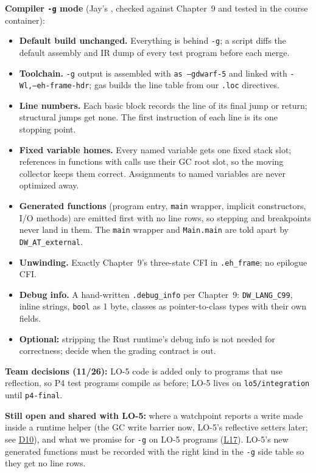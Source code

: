 \documentclass[10pt]{article}
\newcommand{\code}[1]{\texttt{\small #1}}
\begin{document}
\textbf{Compiler \code{-g} mode} (Jay's , checked against Chapter~9 and tested in the course container):
\begin{itemize}
\item \textbf{Default build unchanged.} Everything is behind \code{-g}; a script diffs the default assembly and IR dump of every test program before each merge.
\item \textbf{Toolchain.} \code{-g} output is assembled with \code{as --gdwarf-5} and linked with \code{-Wl,--eh-frame-hdr}; gas builds the line table from our \code{.loc} directives.
\item \textbf{Line numbers.} Each basic block records the line of its final jump or return; structural jumps get none. The first instruction of each line is its one stopping point.
\item \textbf{Fixed variable homes.} Every named variable gets one fixed stack slot; references in functions with calls use their GC root slot, so the moving collector keeps them correct. Assignments to named variables are never optimized away.
\item \textbf{Generated functions} (program entry, \code{main} wrapper, implicit constructors, I/O methods) are emitted first with no line rows, so stepping and breakpoints never land in them. The \code{main} wrapper and \code{Main.main} are told apart by \code{DW\_AT\_external}.
\item \textbf{Unwinding.} Exactly Chapter~9's three-state CFI in \code{.eh\_frame}; no epilogue CFI.
\item \textbf{Debug info.} A hand-written \code{.debug\_info} per Chapter~9: \code{DW\_LANG\_C99}, inline strings, \code{bool} as 1 byte, classes as pointer-to-class types with their own fields.
\item \textbf{Optional:} stripping the Rust runtime's debug info is not needed for correctness; decide when the grading contract is out.
\end{itemize}

\textbf{Team decisions (11/26):} LO-5 code is added only to programs that use reflection, so P4 test programs compile as before; LO-5 lives on \code{lo5/integration} until \code{p4-final}.

\textbf{Still open and shared with LO-5:} where a watchpoint reports a write made inside a runtime helper (the GC write barrier now, LO-5's reflective setters later; see \hyperref[dec:D10]{D10}), and what we promise for \code{-g} on LO-5 programs (\hyperref[dec:L17]{L17}). LO-5's new generated functions must be recorded with the right kind in the \code{-g} side table so they get no line rows.
\end{document}
